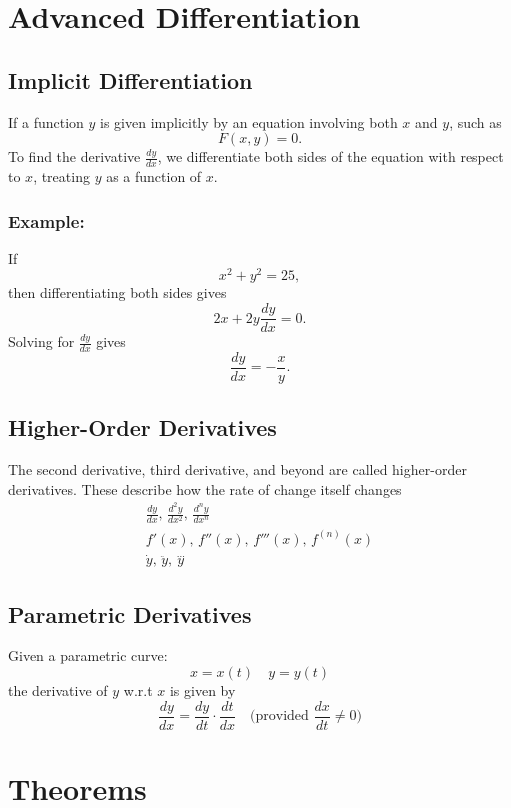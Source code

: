 \documentclass[11pt]{article}
\begin{document}
\section{Advanced Differentiation}
\subsection{Implicit Differentiation}
If a function $y$ is given implicitly by an equation involving both $x$ and $y$, such as
\[
    F(x,y) = 0.
\]
To find the derivative $\displaystyle\frac{dy}{dx}$, we differentiate both sides of the equation with respect to $x$, treating $y$ as a function of $x$.
\subsubsection*{Example:} If
\[
    x^2 + y^2 = 25,
\]
then differentiating both sides gives
\[
    2x + 2y \frac{dy}{dx} = 0.
\]
Solving for $\displaystyle\frac{dy}{dx}$ gives
\[
    \frac{dy}{dx} = -\frac{x}{y}.
\]
\subsection{Higher-Order Derivatives}
The second derivative, third derivative, and beyond are called higher-order derivatives. 
These describe how the rate of change itself changes
\[
    \begin{array}{llll}
        \displaystyle
        \frac{dy}{dx}, \,
        \frac{d^2y}{dx^2}, \, 
        \frac{d^n y}{dx^n}\\[10pt]
        f'(x), \, f''(x), \, f'''(x), \, f^{(n)}(x)\\[6pt]
        \dot{y}, \, \ddot{y}, \, \overset{...}{y}
    \end{array}
\]
\subsection{Parametric Derivatives}
Given a parametric curve:
\[
    x=x(t)\quad y=y(t)
\]
the derivative of $y$ w.r.t $x$ is given by
\[
    \frac{dy}{dx}=\frac{dy}{dt}\cdot\frac{dt}{dx}\quad \text{(provided } \frac{dx}{dt} \neq 0\text{)}
\]

\section{Theorems}
\end{document}
